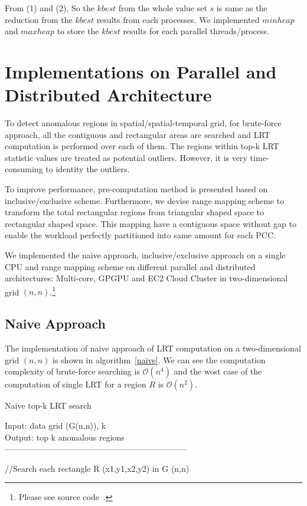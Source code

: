 \documentclass[AMA,LATO1COL]{WileyNJD-v2}
\newcommand\bigo{\mathcal O}
\begin{document}
From (1) and (2), So the $kbest$ from the whole value set $s$ is same as the reduction from the $kbest$ results from each processes. We implemented $minheap$ and $maxheap$ to store the $kbest$ results for each parallel threads/process.

\section {Implementations on Parallel and Distributed Architecture }\label{IMPDA}
To detect anomalous regions in spatial/spatial-temporal grid, for brute-force approach, all the contiguous and rectangular areas are searched and LRT computation is performed over each of them. The regions within top-k LRT statistic values are treated as potential outliers. However, it is very time-consuming to identity the outliers.

To improve performance, pre-computation method is presented based on inclusive/exclusive scheme. Furthermore, we devise range mapping scheme to transform the total rectangular regions from triangular shaped space to rectangular shaped space. This mapping have a contiguous space without gap to enable the workload perfectly partitioned into same amount for each PCC.

We implemented the naive approach, inclusive/exclusive approach on a single CPU and range mapping scheme on different parallel and distributed architectures: Multi-core, GPGPU and EC2 Cloud Cluster in two-dimensional grid $(n,n)$.\footnote{Please see source code~\cite{lrtsrc}.}

\subsection{Naive Approach}
The implementation of naive approach of LRT computation on a two-dimensional grid $(n,n)$ is shown in algorithm~\ref{naive}. We can see the computation complexity of brute-force searching is $\bigo(n^4)$ and the wost case of the computation of single LRT for a region $R$ is $\bigo(n^2)$.

\begin{algorithm}[t!]
\label{algobr1}
\caption{Naive top-k LRT search}\label{naive}
Input: data grid (G(n,n)), k\\
Output: top k anomalous regions\\
------------------------------------------------------------------ \\
\begin{algorithmic}[1]
\State //Search each rectangle R (x1,y1,x2,y2) in G (n,n)
\EndFor
\EndFor
\EndFor
\EndFor
{}
\end{algorithmic}
\end{algorithm}
\end{document}
